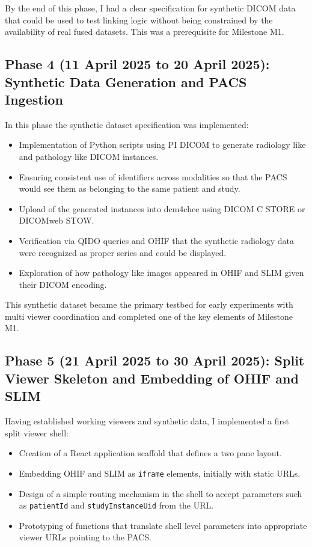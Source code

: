 \documentclass[11pt,a4paper]{article}
\begin{document}
By the end of this phase, I had a clear specification for synthetic DICOM data that could be used to test linking logic without being constrained by the availability of real fused datasets. This was a prerequisite for Milestone M1.

\subsection*{Phase 4 (11 April 2025 to 20 April 2025): Synthetic Data Generation and PACS Ingestion}

In this phase the synthetic dataset specification was implemented:

\begin{itemize}
    \item Implementation of Python scripts using PI DICOM to generate radiology like and pathology like DICOM instances.
    \item Ensuring consistent use of identifiers across modalities so that the PACS would see them as belonging to the same patient and study.
    \item Upload of the generated instances into dcm4chee using DICOM C STORE or DICOMweb STOW.
    \item Verification via QIDO queries and OHIF that the synthetic radiology data were recognized as proper series and could be displayed.
    \item Exploration of how pathology like images appeared in OHIF and SLIM given their DICOM encoding.
\end{itemize}

This synthetic dataset became the primary testbed for early experiments with multi viewer coordination and completed one of the key elements of Milestone M1.

\subsection*{Phase 5 (21 April 2025 to 30 April 2025): Split Viewer Skeleton and Embedding of OHIF and SLIM}

Having established working viewers and synthetic data, I implemented a first split viewer shell:

\begin{itemize}
    \item Creation of a React application scaffold that defines a two pane layout.
    \item Embedding OHIF and SLIM as \texttt{iframe} elements, initially with static URLs.
    \item Design of a simple routing mechanism in the shell to accept parameters such as \texttt{patientId} and \texttt{studyInstanceUid} from the URL.
    \item Prototyping of functions that translate shell level parameters into appropriate viewer URLs pointing to the PACS.
\end{itemize}
\end{document}
